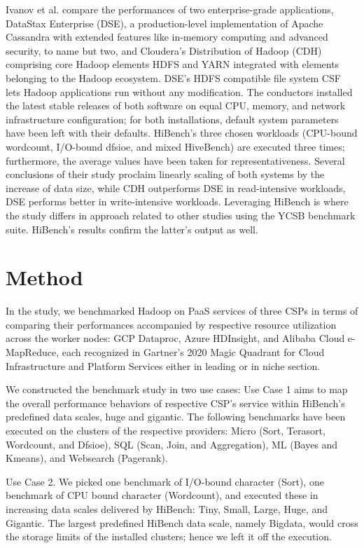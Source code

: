 \documentclass[review]{elsarticle}
\begin{document}
Ivanov et al. \cite{ivanov_performance_2015} compare the performances of two enterprise-grade applications, DataStax Enterprise (DSE), a production-level implementation of Apache Cassandra with extended features like in-memory computing and advanced security, to name but two, and Cloudera's Distribution of Hadoop (CDH) comprising core Hadoop elements HDFS and YARN integrated with elements belonging to the Hadoop ecosystem. DSE's HDFS compatible file system CSF lets Hadoop applications run without any modification. The conductors installed the latest stable releases of both software on equal CPU, memory, and network infrastructure configuration; for both installations, default system parameters have been left with their defaults. HiBench's three chosen workloads (CPU-bound wordcount, I/O-bound dfsioe, and mixed HiveBench) are executed three times; furthermore, the average values have been taken for representativeness. Several conclusions of their study proclaim linearly scaling of both systems by the increase of data size, while CDH outperforms DSE in read-intensive workloads, DSE performs better in write-intensive workloads. Leveraging HiBench is where the study differs in approach related to other studies using the YCSB benchmark suite. HiBench's results confirm the latter's output as well.

\section{Method}

In the study, we benchmarked Hadoop on PaaS services of three CSPs in terms of comparing their performances accompanied by respective resource utilization across the worker nodes: GCP Dataproc, Azure HDInsight, and Alibaba Cloud e-MapReduce, each recognized in Gartner's 2020 Magic Quadrant for Cloud Infrastructure and Platform Services \cite{noauthor_gartner_nodate} either in leading or in niche section.

We constructed the benchmark study in two use cases: Use Case 1 aims to map the overall performance behaviors of respective CSP's service within HiBench's predefined data scales, huge and gigantic. The following benchmarks have been executed on the clusters of the respective providers: Micro (Sort, Terasort, Wordcount, and Dfsioe), SQL (Scan, Join, and Aggregation), ML (Bayes and Kmeans), and Websearch (Pagerank).

Use Case 2. We picked one benchmark of I/O-bound character (Sort), one benchmark of CPU bound character (Wordcount), and executed these in increasing data scales delivered by HiBench: Tiny, Small, Large, Huge, and Gigantic. The largest predefined HiBench data scale, namely Bigdata, would cross the storage limits of the installed clusters; hence we left it off the execution.
\end{document}
